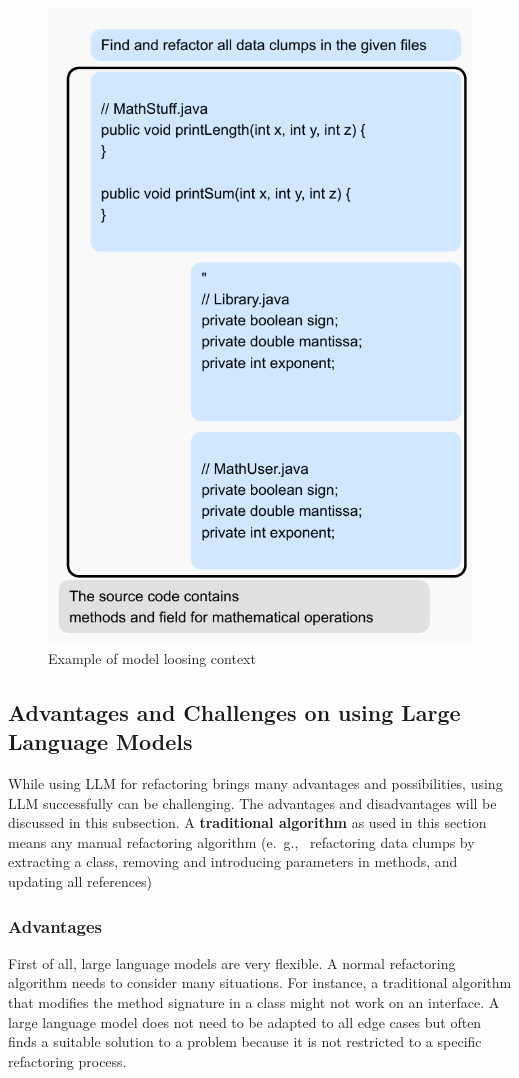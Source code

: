 \begin{figure}[ht!]
    \centering
    \includegraphics[width=0.6\columnwidth]{figures/chapter2/chat_dialog.pdf}
    \caption{Example of model loosing context}
    \label{fig:llm_loose_context}
\end{figure}

\subsection{Advantages and Challenges on using Large Language Models}\label{sec:llm_challenges}

While using  \ac{LLM} for refactoring brings many advantages  and possibilities, using \ac{LLM}  successfully can be challenging. The advantages and disadvantages will be discussed in this subsection. A \textbf{traditional algorithm} as used in this section means any manual refactoring algorithm (e.~g.,~ refactoring data clumps by extracting a class, removing and introducing parameters in methods, and updating all references)

\subsubsection{Advantages}

First of all, large language models are very flexible. A normal refactoring algorithm needs to consider many situations. For instance, a traditional algorithm that modifies the method signature in a class might not work on an interface. A large language model does not need to be adapted to all edge cases but often finds a suitable solution to a problem because it is not restricted to a specific refactoring process. \cite{shirafuji2023refactoring}

